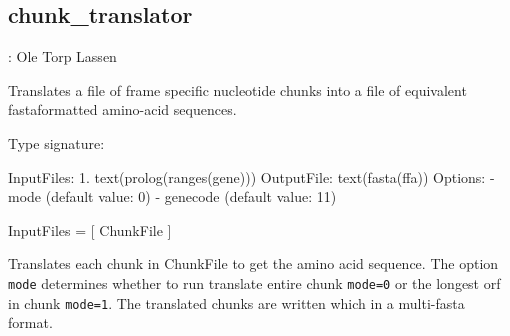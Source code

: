 


\subsection{chunk_translator}

\label{sec:chunktranslator}

\begin{tags}
: Ole Torp Lassen
\end{tags}

Translates a file of frame specific nucleotide chunks into a file of equivalent fastaformatted amino-acid sequences.\vspace{0.7cm}

\begin{description}
Type signature:

\begin{code}
InputFiles:
    1. text(prolog(ranges(gene)))
OutputFile:
    text(fasta(ffa))
Options:
    - mode (default value: 0)
    - genecode (default value: 11)
\end{code}

\begin{code}
 InputFiles = [ ChunkFile ]
\end{code}

Translates each chunk in ChunkFile to get the amino acid sequence.
The option \verb$mode$ determines whether to run translate entire chunk \verb$mode=0$ or the longest orf in chunk \verb$mode=1$.
The translated chunks are written  which in a multi-fasta format.
\end{description}

